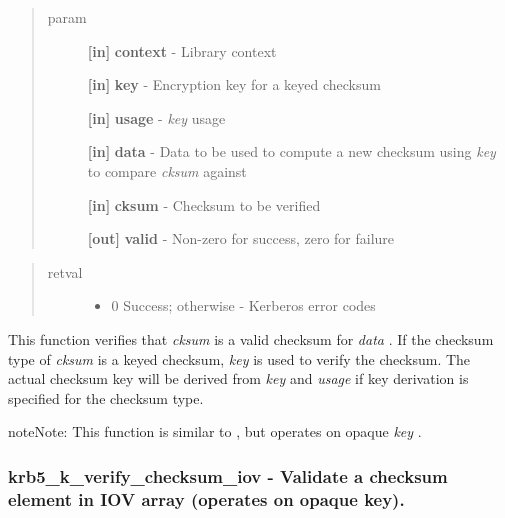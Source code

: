 \documentclass[letterpaper,10pt,english]{sphinxmanual}
\begin{document}
\begin{quote}\begin{description}
\item[{param}] \leavevmode
\textbf{{[}in{]}} \textbf{context} - Library context

\textbf{{[}in{]}} \textbf{key} - Encryption key for a keyed checksum

\textbf{{[}in{]}} \textbf{usage} - \emph{key} usage

\textbf{{[}in{]}} \textbf{data} - Data to be used to compute a new checksum using \emph{key} to compare \emph{cksum} against

\textbf{{[}in{]}} \textbf{cksum} - Checksum to be verified

\textbf{{[}out{]}} \textbf{valid} - Non-zero for success, zero for failure

\end{description}\end{quote}
\begin{quote}\begin{description}
\item[{retval}] \leavevmode\begin{itemize}
\item {} 
0   Success; otherwise - Kerberos error codes

\end{itemize}

\end{description}\end{quote}

This function verifies that \emph{cksum} is a valid checksum for \emph{data} . If the checksum type of \emph{cksum} is a keyed checksum, \emph{key} is used to verify the checksum. The actual checksum key will be derived from \emph{key} and \emph{usage} if key derivation is specified for the checksum type.

\begin{notice}{note}{Note:}
This function is similar to {\hyperref[appdev/refs/api/krb5_c_verify_checksum:krb5_c_verify_checksum]{}} , but operates on opaque \emph{key} .
\end{notice}


\subsubsection{krb5\_k\_verify\_checksum\_iov -  Validate a checksum element in IOV array (operates on opaque key).}
\label{appdev/refs/api/krb5_k_verify_checksum_iov:krb5-k-verify-checksum-iov-validate-a-checksum-element-in-iov-array-operates-on-opaque-key}\label{appdev/refs/api/krb5_k_verify_checksum_iov::doc}
\end{document}
